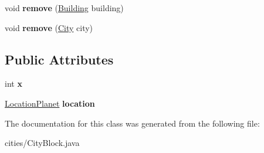 \begin{DoxyCompactItemize}
\item 
void {\bfseries remove} (\hyperlink{classbuildings_1_1_building}{Building} building)\hypertarget{classcities_1_1_city_block_a0e726dc34a08baed9b05e5469762c04b}{}\label{classcities_1_1_city_block_a0e726dc34a08baed9b05e5469762c04b}

\item 
void {\bfseries remove} (\hyperlink{classcities_1_1_city}{City} city)\hypertarget{classcities_1_1_city_block_a9a646ca72bc7909284748ca2358c4c3f}{}\label{classcities_1_1_city_block_a9a646ca72bc7909284748ca2358c4c3f}

\end{DoxyCompactItemize}
\subsection*{Public Attributes}
\begin{DoxyCompactItemize}
\item 
int {\bfseries x}\hypertarget{classcities_1_1_city_block_a1b2cfb5ae1bf2ebf8fd3bf94a8ed9dbf}{}\label{classcities_1_1_city_block_a1b2cfb5ae1bf2ebf8fd3bf94a8ed9dbf}

\item 
\hyperlink{classplanets_1_1_location_planet}{Location\+Planet} {\bfseries location}\hypertarget{classcities_1_1_city_block_a1ced11ffb33235b78dc793e7511fd462}{}\label{classcities_1_1_city_block_a1ced11ffb33235b78dc793e7511fd462}

\end{DoxyCompactItemize}


The documentation for this class was generated from the following file\+:\begin{DoxyCompactItemize}
\item 
cities/City\+Block.\+java\end{DoxyCompactItemize}
